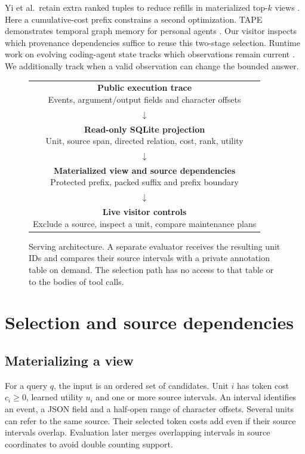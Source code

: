 \documentclass[conference]{IEEEtran}
\begin{document}
Yi et al.\ retain extra ranked tuples to reduce refills in materialized top-$k$ views \cite{topk}. Here a cumulative-cost prefix constrains a second optimization. TAPE demonstrates temporal graph memory for personal agents \cite{tape}. Our visitor inspects which provenance dependencies suffice to reuse this two-stage selection. Runtime work on evolving coding-agent state tracks which observations remain current \cite{execledger}. We additionally track when a valid observation can change the bounded answer.

\begin{figure}[t]
\centering
\setlength{\fboxsep}{4pt}
\begin{tabular}{@{}c@{}}
\fcolorbox{forest}{white}{\parbox{.88\columnwidth}{\centering \textbf{Public execution trace}\\Events, argument/output fields and character offsets}}\\
$\downarrow$\\
\fcolorbox{forest}{white}{\parbox{.88\columnwidth}{\centering \textbf{Read-only SQLite projection}\\Unit, source span, directed relation, cost, rank, utility}}\\
$\downarrow$\\
\fcolorbox{forest}{white}{\parbox{.88\columnwidth}{\centering \textbf{Materialized view and source dependencies}\\Protected prefix, packed suffix and prefix boundary}}\\
$\downarrow$\\
\fcolorbox{forest}{white}{\parbox{.88\columnwidth}{\centering \textbf{Live visitor controls}\\Exclude a source, inspect a unit, compare maintenance plans}}\\
\end{tabular}
\caption{Serving architecture. A separate evaluator receives the resulting unit IDs and compares their source intervals with a private annotation table on demand. The selection path has no access to that table or to the bodies of tool calls.}
\label{fig:system}
\end{figure}

\section{Selection and source dependencies}

\subsection{Materializing a view}
For a query $q$, the input is an ordered set of candidates. Unit $i$ has token cost $c_i\geq 0$, learned utility $u_i$ and one or more source intervals. An interval identifies an event, a JSON field and a half-open range of character offsets. Several units can refer to the same source. Their selected token costs add even if their source intervals overlap. Evaluation later merges overlapping intervals in source coordinates to avoid double counting support.
\end{document}
